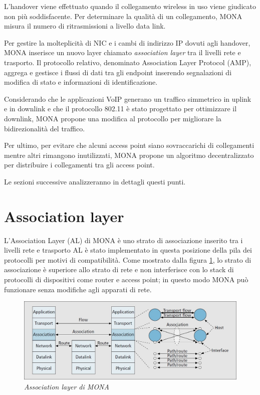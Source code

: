 \documentclass[12pt,a4paper,openright,twoside]{book}
\begin{document}
L'handover viene effettuato quando il collegamento wireless in uso
viene giudicato non più soddisfacente. Per determinare la qualità di
un collegamento, MONA misura il numero di ritrasmissioni a livello
data link.

Per gestire la molteplicità di NIC e i cambi di indirizzo IP dovuti
agli handover, MONA inserisce un nuovo layer chiamato
\emph{association layer} tra il livelli rete e trasporto. Il
protocollo relativo, denominato Association Layer Protocol (AMP),
aggrega e gestisce i flussi di dati tra gli endpoint inserendo
segnalazioni di modifica di stato e informazioni di identificazione.

Considerando che le applicazioni VoIP generano un traffico simmetrico
in uplink e in downlink e che il protocollo 802.11 è stato progettato
per ottimizzare il downlink, MONA propone una modifica al protocollo
per migliorare la bidirezionalità del traffico.

Per ultimo, per evitare che alcuni access point siano sovraccarichi di
collegamenti mentre altri rimangono inutilizzati, MONA propone un
algoritmo decentralizzato per distribuire i collegamenti tra gli
access point.

Le sezioni successive analizzeranno in dettagli questi punti.

\section{Association layer}

L'Association Layer (AL) di MONA è uno strato di associazione inserito
tra i livelli rete e trasporto AL è stato implementato in questa
posizione della pila dei protocolli per motivi di compatibilità. Come
mostrato dalla figura \ref{fig:mona-association-layer}, lo strato di
associazione è superiore allo strato di rete e non interferisce con lo
stack di protocolli di dispositivi come router e access point; in
questo modo MONA può funzionare senza modifiche agli apparati di rete.

\begin{figure}
\centering
\includegraphics[width=\textwidth]{img/mona-association-layer}
\caption{\em Association layer di MONA}
\label{fig:mona-association-layer}
\end{figure}
\end{document}
